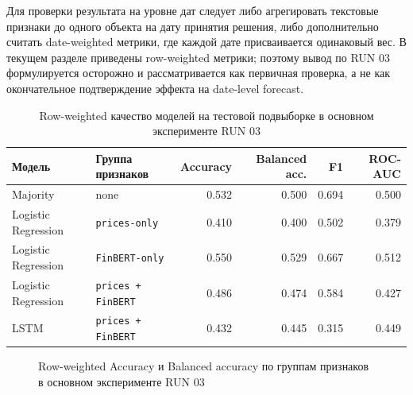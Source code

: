 Для проверки результата на уровне дат следует либо агрегировать текстовые признаки до одного объекта на дату принятия решения, либо дополнительно считать date-weighted метрики, где каждой дате присваивается одинаковый вес. В текущем разделе приведены row-weighted метрики; поэтому вывод по RUN 03 формулируется осторожно и рассматривается как первичная проверка, а не как окончательное подтверждение эффекта на date-level forecast.

\begin{table}[H]
\centering
\begin{tabular}{llrrrr}
\toprule
Модель & Группа признаков & Accuracy & Balanced acc. & F1 & ROC-AUC \\
\midrule
Majority & none & 0.532 & 0.500 & 0.694 & 0.500 \\
Logistic Regression & \texttt{prices-only} & 0.410 & 0.400 & 0.502 & 0.379 \\
Logistic Regression & \texttt{FinBERT-only} & 0.550 & 0.529 & 0.667 & 0.512 \\
Logistic Regression & \texttt{prices + FinBERT} & 0.486 & 0.474 & 0.584 & 0.427 \\
LSTM & \texttt{prices + FinBERT} & 0.432 & 0.445 & 0.315 & 0.449 \\
\bottomrule
\end{tabular}
\caption{Row-weighted качество моделей на тестовой подвыборке в основном эксперименте RUN 03}
\label{tab:run03_test_metrics}
\end{table}

\begin{figure}[H]
\centering
{}
\caption{Row-weighted Accuracy и Balanced accuracy по группам признаков в основном эксперименте RUN 03}
\label{fig:run03_accuracy_balanced_accuracy}
\end{figure}

